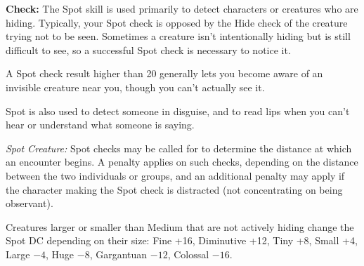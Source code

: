\textbf{Check:} The Spot skill is used primarily to detect characters or creatures who are hiding. Typically, your Spot check is opposed by the Hide check of the creature trying not to be seen. Sometimes a creature isn't intentionally hiding but is still difficult to see, so a successful Spot check is necessary to notice it.

A Spot check result higher than 20 generally lets you become aware of an invisible creature near you, though you can't actually see it.

Spot is also used to detect someone in disguise, and to read lips when you can't hear or understand what someone is saying.



\textit{Spot Creature:} Spot checks may be called for to determine the distance at which an encounter begins. A penalty applies on such checks, depending on the distance between the two individuals or groups, and an additional penalty may apply if the character making the Spot check is distracted (not concentrating on being observant).

Creatures larger or smaller than Medium that are not actively hiding change the Spot DC depending on their size: Fine +16, Diminutive +12, Tiny +8, Small +4, Large $-4$, Huge $-8$, Gargantuan $-12$, Colossal $-16$.

